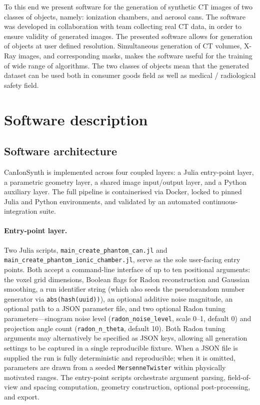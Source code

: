 \documentclass[preprint,12pt, a4paper]{elsarticle}
\begin{document}
To this end we present software for the generation of synthetic CT images of two classes of objects, namely: ionization chambers, and aerosol cans. The software was developed in collaboration with team collecting real CT data, in order to ensure validity of generated images. The presented software allows for generation of objects at user defined resolution. Simultaneous generation of CT volumes, X-Ray images, and corresponding masks, makes the software useful for the training of wide range of algorithms. The two classes of objects mean that the generated dataset can be used both in consumer goods field as well as medical / radiological safety field.


\section{Software description}

\subsection{Software architecture}
CanIonSynth is implemented across four coupled layers: a Julia entry-point layer, a parametric geometry layer, a shared image input/output layer, and a Python auxiliary layer. The full pipeline is containerised via Docker, locked to pinned Julia and Python environments, and validated by an automated continuous-integration suite.

\paragraph{Entry-point layer.}
Two Julia scripts, \mbox{\texttt{main\_create\_phantom\_can.jl}} and
\mbox{\texttt{main\_create\_phantom\_ionic\_chamber.jl}}, serve as the sole user-facing entry points. Both accept a command-line interface of up to ten positional arguments: the voxel grid dimensions, Boolean flags for Radon reconstruction and Gaussian smoothing, a run identifier string (which also seeds the pseudorandom number generator via \mbox{\texttt{abs(hash(uuid))}}), an optional additive noise magnitude, an optional path to a JSON parameter file, and two optional Radon tuning parameters---sinogram noise level (\mbox{\texttt{radon\_noise\_level}}, scale 0--1, default 0) and projection angle count (\mbox{\texttt{radon\_n\_theta}}, default 10). Both Radon tuning arguments may alternatively be specified as JSON keys, allowing all generation settings to be captured in a single reproducible fixture. When a JSON file is supplied the run is fully deterministic and reproducible; when it is omitted, parameters are drawn from a seeded \mbox{\texttt{MersenneTwister}} within physically motivated ranges. The entry-point scripts orchestrate argument parsing, field-of-view and spacing computation, geometry construction, optional post-processing, and export.
\end{document}
